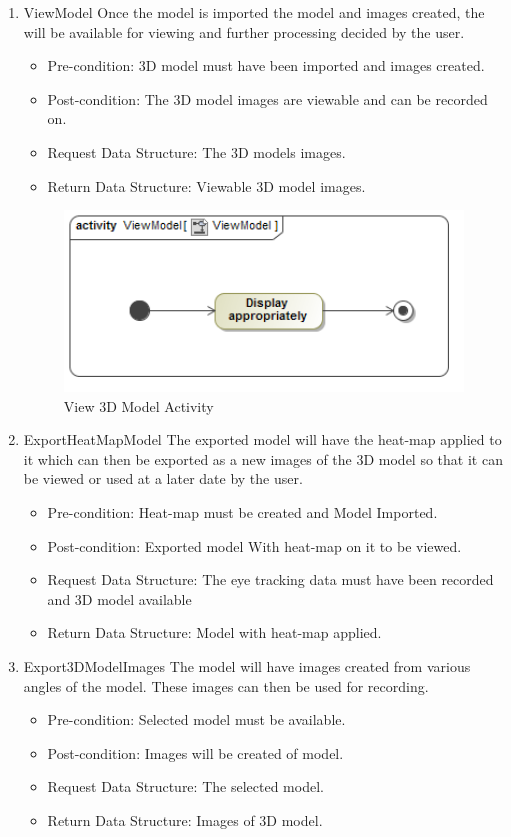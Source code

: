 \begin{enumerate}
		\item{ViewModel}
		Once the model is imported the model and images created, the will be available for viewing and further processing decided by the user.
		\begin{itemize}
			\item Pre-condition: 3D model must have been imported and images created.
			\item Post-condition: The 3D model images are viewable and can be recorded on.
			\item Request Data Structure: The 3D models images.
			\item Return Data Structure: Viewable 3D model images.
		\end{itemize}
		\begin{figure}[!ht]
			\centering
			\includegraphics[scale=0.5,width=15cm,keepaspectratio]{Diagrams/Activity_Diagram__ViewModel__ViewModel.png}
		\caption{View 3D Model Activity}
		\end{figure}
		
		\item{ExportHeatMapModel}
		The exported model will have the heat-map applied to it which can then be exported as a new images of the 3D model so that it can be viewed or used at a later date by the user. 
		\begin{itemize}
			\item Pre-condition: Heat-map must be created and Model Imported.
			\item Post-condition: Exported model With heat-map on it to be viewed.
			\item Request Data Structure: The eye tracking data must have been recorded and 3D model available
			\item Return Data Structure: Model with heat-map applied.
		\end{itemize}
		
		\item{Export3DModelImages}
		The model will have images created from various angles of the model. These images can then be used for recording.
		\begin{itemize}
			\item Pre-condition: Selected model must be available.
			\item Post-condition: Images will be created of model.
			\item Request Data Structure: The selected model.
			\item Return Data Structure: Images of 3D model.
		\end{itemize}
		

\end{enumerate}
